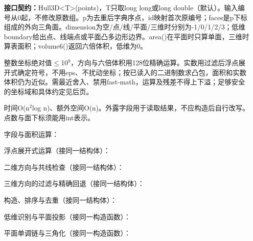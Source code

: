 {\sloppy{}\noindent\textbf{接口契约：}Hull3D<T>(points)，T只取long long或long double（默认）。输入编号从0起，不修改原数组。p为去重后字典序点，id映射首次原编号；faces是p下标组成的外向三角面。dimension为空/点/线/平面/三维时分别为-1/0/1/2/3；低维boundary给出点、线端点或平面凸多边形边界。area()在平面时只算单面，三维时算表面积；volume6()返回六倍体积，低维为0。

整数坐标绝对值$\le$10$^{9}$，方向与六倍体积用128位精确运算。实数用过滤后浮点展开式确定符号，不用eps、不扰动坐标；按已读入的二进制数求凸包，面积和实数体积仍为近似。需最近舍入、禁用fast-math，运算及残差不得上下溢；足够安全的坐标域和具体约定见后页。

时间O(n$^{2}$log n)、额外空间O(n)。外露字段用于读取结果，不应构造后自行改写。点数与面下标须能用int表示。\par}

字段与面积运算：

\Needspace{426pt}



\newpage

浮点展开式运算（接同一结构体）：



\newpage

二维方向与共线检查（接同一结构体）：



\newpage

三维方向的过滤与精确回退（接同一结构体）：



\newpage

构造、排序与去重（接同一结构体）：



\newpage

低维识别与平面投影（接同一构造函数）：



\newpage

平面单调链与三角化（接同一构造函数）：



